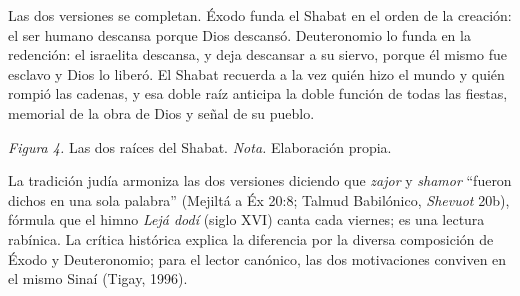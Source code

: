 \documentclass[11pt,letterpaper]{article}
\newcommand{\heb}[1]{\mbox{\foreignlanguage{hebrew}{#1}}}
\begin{document}
Las dos versiones se completan. Éxodo funda el Shabat en el orden de la creación: el ser humano descansa porque Dios descansó. Deuteronomio lo funda en la redención: el israelita descansa, y deja descansar a su siervo, porque él mismo fue esclavo y Dios lo liberó. El Shabat recuerda a la vez quién hizo el mundo y quién rompió las cadenas, y esa doble raíz anticipa la doble función de todas las fiestas, memorial de la obra de Dios y señal de su pueblo.

\begin{center}
\par
{\footnotesize\color{sepia}\textit{Figura 4.} Las dos raíces del Shabat. \textit{Nota.} Elaboración propia.}
\end{center}

\begin{nota}[Precisión]
La tradición judía armoniza las dos versiones diciendo que \emph{zajor} y \emph{shamor} ``fueron dichos en una sola palabra'' (Mejiltá a Éx 20:8; Talmud Babilónico, \emph{Shevuot} 20b), fórmula que el himno \emph{Lejá dodí} (siglo XVI) canta cada viernes; es una lectura rabínica. La crítica histórica explica la diferencia por la diversa composición de Éxodo y Deuteronomio; para el lector canónico, las dos motivaciones conviven en el mismo Sinaí (Tigay, 1996).
\end{nota}
\end{document}
